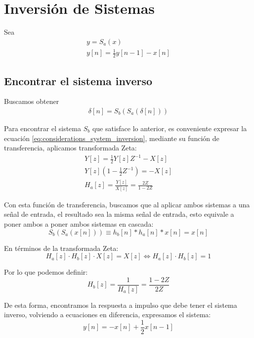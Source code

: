 \section{Inversión de Sistemas}
	Sea
	\begin{align}
		y = S_{a}(x) \\
		y[n] = \frac{1}{2}y[n-1]-x[n]
		\label{eq:considerations_system_inversion}
	\end{align}
	\subsection{Encontrar el sistema inverso}
		Buscamos obtener
		\begin{align}
			\delta[n] = S_{b}(S_{a}(\delta[n]))
			\label{eq:system_inverse_target}
		\end{align}
		
		Para encontrar el sistema $S_{b}$ que satisface lo anterior, es conveniente expresar la ecuación \ref{eq:considerations_system_inversion}, mediante su función de transferencia, aplicamos transformada Zeta:
		\begin{align}
			Y[z] = \frac{1}{2}Y[z]Z^{-1} - X[z] \\
			Y[z] \left( 1 - \frac{1}{2}Z^{-1} \right) = -X[z] \\
			H_{a}[z] = \frac{Y[z]}{X[z]} = \frac{2Z}{1 - 2Z}
			\label{eq:transfer_function_ha}
		\end{align}
		

		Con esta función de transferencia, buscamos que al aplicar ambos sistemas a una señal de entrada, el resultado sea la misma señal de entrada, esto equivale a poner ambos a poner ambos sistemas en cascada:
		\begin{equation}
			S_{b}(S_{a}(x[n])) \equiv h_{b}[n] * h_{a}[n] * x[n] = x[n]
		\end{equation}
		
		En términos de la transformada Zeta:
		\begin{equation}
			H_{a}[z] \cdot H_{b}[z] \cdot X[z] = X[z] \Longleftrightarrow H_{a}[z] \cdot H_{b}[z] = 1
 		\end{equation}
 		
 		Por lo que podemos definir:
 		\begin{equation}
 			\boxed{H_{b}[z] = \frac{1}{H_{a}[z]} = \frac{1 -2Z}{2Z}}
 		\end{equation}
 		
 		De esta forma, encontramos la respuesta a impulso que debe tener el sistema inverso, volviendo a ecuaciones en diferencia, expresamos el sistema:
 		\begin{equation}
 			\boxed{y[n] = -x[n] + \frac{1}{2}x[n-1]}
 			\label{eq:2_inverse_system}
 		\end{equation}
 		

